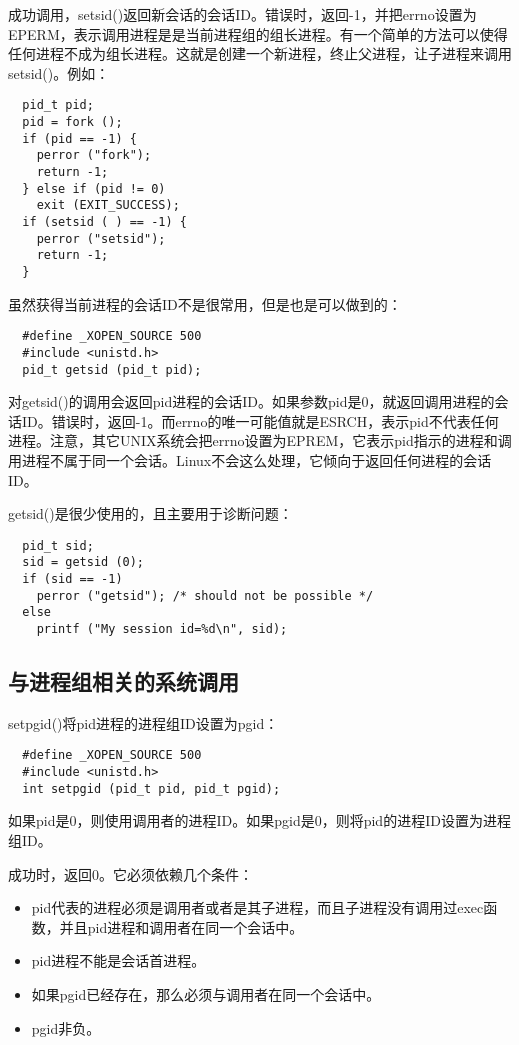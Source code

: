 成功调用，setsid()返回新会话的会话ID。错误时，返回-1，并把errno设置为EPERM，表示调用进程是是当前进程组的组长进程。有一个简单的方法可以使得任何进程不成为组长进程。这就是创建一个新进程，终止父进程，让子进程来调用setsid()。例如：

\begin{lstlisting}
  pid_t pid;
  pid = fork ();
  if (pid == -1) {
    perror ("fork");
    return -1;
  } else if (pid != 0)
    exit (EXIT_SUCCESS);
  if (setsid ( ) == -1) {
    perror ("setsid");
    return -1;
  }
\end{lstlisting}

虽然获得当前进程的会话ID不是很常用，但是也是可以做到的：

\begin{lstlisting}
  #define _XOPEN_SOURCE 500
  #include <unistd.h>
  pid_t getsid (pid_t pid);
\end{lstlisting}

对getsid()的调用会返回pid进程的会话ID。如果参数pid是0，就返回调用进程的会话ID。错误时，返回-1。而errno的唯一可能值就是ESRCH，表示pid不代表任何进程。注意，其它UNIX系统会把errno设置为EPREM，它表示pid指示的进程和调用进程不属于同一个会话。Linux不会这么处理，它倾向于返回任何进程的会话ID。

getsid()是很少使用的，且主要用于诊断问题：

\begin{lstlisting}
  pid_t sid;
  sid = getsid (0);
  if (sid == -1)
    perror ("getsid"); /* should not be possible */
  else
    printf ("My session id=%d\n", sid);
\end{lstlisting}

\subsection{与进程组相关的系统调用}

setpgid()将pid进程的进程组ID设置为pgid：

\begin{lstlisting}
  #define _XOPEN_SOURCE 500
  #include <unistd.h>
  int setpgid (pid_t pid, pid_t pgid);
\end{lstlisting}

如果pid是0，则使用调用者的进程ID。如果pgid是0，则将pid的进程ID设置为进程组ID。

成功时，返回0。它必须依赖几个条件：

\begin{itemize}
\item pid代表的进程必须是调用者或者是其子进程，而且子进程没有调用过exec函数，并且pid进程和调用者在同一个会话中。
\item pid进程不能是会话首进程。
\item 如果pgid已经存在，那么必须与调用者在同一个会话中。
\item pgid非负。
\end{itemize}

